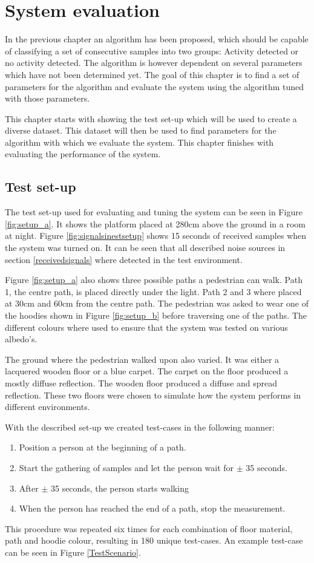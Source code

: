 \chapter{System evaluation}
\label{System_evaluation}
In the previous chapter an algorithm has been proposed, which should be capable of classifying a set of consecutive samples into two groups: Activity detected or no activity detected. The algorithm is however dependent on several parameters which have not been determined yet. The goal of this chapter is to find a set of parameters for the algorithm and evaluate the system using the algorithm tuned with those parameters.

This chapter starts with showing the test set-up which will be used to create a diverse dataset. This dataset will then be used to find parameters for the algorithm with which we evaluate the system. This chapter finishes with evaluating the performance of the system.

\section{Test set-up}
\label{dataset}
The test set-up used for evaluating and tuning the system can be seen in Figure \ref{fig:setup_a}. It shows the platform placed at 280cm above the ground in a room at night. Figure \ref{fig:signalsinestsetup} shows 15 seconds of received samples when the system was turned on. It can be seen that all described noise sources in section \ref{receivedsignals} where detected in the test environment.

Figure \ref{fig:setup_a} also shows three possible paths a pedestrian can walk. Path 1, the centre path, is placed directly under the light. Path 2 and 3 where placed at 30cm and 60cm from the centre path. The pedestrian was asked to wear one of the hoodies shown in Figure \ref{fig:setup_b} before traversing one of the paths. The different colours where used to ensure that the system was tested on various albedo's.

The ground where the pedestrian walked upon also varied. It was either a lacquered wooden floor or a blue carpet. The carpet on the floor produced a mostly diffuse reflection. The wooden floor produced a diffuse and spread reflection. These two floors were chosen to simulate how the system performs in different environments.

With the described set-up we created test-cases in the following manner:
\begin{enumerate}[itemsep=-1ex,topsep=0pt]
	\item Position a person at the beginning of a path.
	\item Start the gathering of samples and let the person wait for $\pm$ 35 seconds.
	\item After $\pm$ 35 seconds, the person starts walking
	\item When the person has reached the end of a path, stop the measurement.
\end{enumerate}
This procedure was repeated six times for each combination of floor material, path and hoodie colour, resulting in 180 unique test-cases. An example test-case can be seen in Figure \ref{TestScenario}. 

